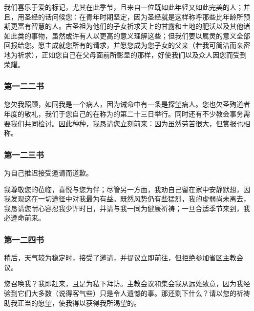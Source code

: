 我们喜乐于爱的标记，尤其在此季节，且来自一位既如此年轻又如此完美的人；并且，用圣经的话问候您：在青年时期坚定，因为圣经就是这样称呼那些比年龄所预期更富有智慧的人。古圣祖为他们的子女祈求天上的甘露和土地的肥沃以及其他诸如此类的事物，虽然或许有人以更高的意义理解这些；但我们要以属灵的意义全部回报给您。愿主成就您所有的请求，并愿您成为您子女的父亲（若我可简洁而亲密地为祈求），正如您自己在父母面前所彰显的那样，好使我们以及众人因您而受到荣耀。\par


\subsubsection{第一二二书}

您欠我照顾，如同我是一个病人，因为诫命中有一条是探望病人。您也欠圣殉道者年度的敬礼，我们于您自己的在称为的第二十三日举行。同时还有不少教会事务需要我们共同检讨。因此种种，我恳请您立刻前来：因为虽然劳苦很大，但赏报也相称。\par


\subsubsection{第一二三书}

为自己推迟接受邀请而道歉。\par

我尊敬您的莅临，喜悦与您为伴；尽管另一方面，我劝自己留在家中安静默想，因我发现这在一切途径中对我最为有益。既然风势仍有些猛烈，我的虚弱尚未离去，我恳请您耐心容忍我少许时日，并请与我一同为健康祈祷；一旦合适季节来到，我必遵命前来。\par


\subsubsection{第一二四书}

稍后，天气较为稳定时，接受了邀请，并提议立即前往，但拒绝参加省区主教会议。\par

您召唤我？我即赶来，且是为私下拜访。主教会议和集会我从远处致意，因为我经验到它们大多数（说得客气些）只是令人遗憾的事。那还剩下什么？请以您的祈祷助我正当的愿望，使我得以获得我所渴望的。\par

